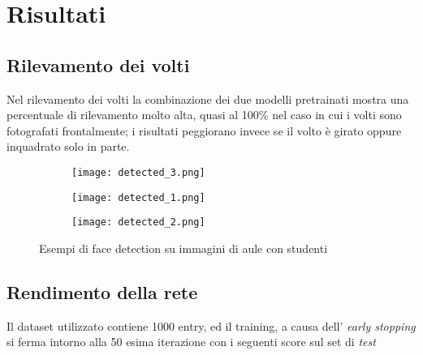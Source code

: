 \chapter{Risultati}
\label{section:results}

\section{Rilevamento dei volti}
\label{section:results_fd}

Nel rilevamento dei volti la combinazione dei due modelli pretrainati mostra
una percentuale di rilevamento molto alta, quasi al 100\% nel caso in cui i volti sono 
fotografati frontalmente; i risultati peggiorano invece se il volto è girato oppure 
inquadrato solo in parte. 

\smallskip

\begin{figure}[h]
    \centering
    \begin{subfigure}[b]{0.7\linewidth}
      \texttt{[image: detected\_3.png]}
    \end{subfigure}

    \smallskip
    
    \begin{subfigure}[b]{0.7\linewidth}
        \texttt{[image: detected\_1.png]}
    \end{subfigure}

    \smallskip
    
    \begin{subfigure}[b]{0.7\linewidth}
        \texttt{[image: detected\_2.png]}
    \end{subfigure}
    \caption{Esempi di face detection su immagini di aule con studenti}
    \label{fig:example_opencv}
\end{figure}

\section{Rendimento della rete}
\label{section:results_ml}

Il dataset utilizzato contiene 1000 entry, ed il training, a causa dell'
\textit{early stopping} si ferma intorno alla 50 esima iterazione con i seguenti 
score sul set di \textit{test}

\smallskip


